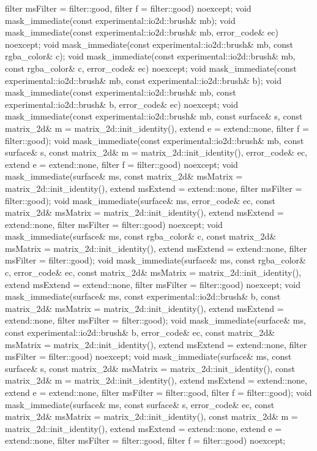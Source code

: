 \begin{codeblock}
{{{{{      filter msFilter = filter::good, filter f = filter::good) noexcept;
    void mask_immediate(const experimental::io2d::brush& mb);
    void mask_immediate(const experimental::io2d::brush& mb, error_code& ec)
      noexcept;
    void mask_immediate(const experimental::io2d::brush& mb,
      const rgba_color& c);
    void mask_immediate(const experimental::io2d::brush& mb,
      const rgba_color& c, error_code& ec) noexcept;
    void mask_immediate(const experimental::io2d::brush& mb,
      const experimental::io2d::brush& b);
    void mask_immediate(const experimental::io2d::brush& mb,
      const experimental::io2d::brush& b, error_code& ec) noexcept;
    void mask_immediate(const experimental::io2d::brush& mb, const surface& s, 
      const matrix_2d& m = matrix_2d::init_identity(), extend e = extend::none, 
      filter f = filter::good);
    void mask_immediate(const experimental::io2d::brush& mb, const surface& s,
      const matrix_2d& m = matrix_2d::init_identity(), error_code& ec,
      extend e = extend::none, filter f = filter::good) noexcept;
    void mask_immediate(surface& ms,
      const matrix_2d& msMatrix = matrix_2d::init_identity(),
      extend msExtend = extend::none, filter msFilter = filter::good);
    void mask_immediate(surface& ms, error_code& ec, 
      const matrix_2d& msMatrix = matrix_2d::init_identity(),
      extend msExtend = extend::none, filter msFilter = filter::good) noexcept;
    void mask_immediate(surface& ms, const rgba_color& c, 
      const matrix_2d& msMatrix = matrix_2d::init_identity(),
      extend msExtend = extend::none, filter msFilter = filter::good);
    void mask_immediate(surface& ms, const rgba_color& c, error_code& ec, 
      const matrix_2d& msMatrix = matrix_2d::init_identity(),
      extend msExtend = extend::none, filter msFilter = filter::good) noexcept;
    void mask_immediate(surface& ms, const experimental::io2d::brush& b, 
      const matrix_2d& msMatrix = matrix_2d::init_identity(),
      extend msExtend = extend::none, filter msFilter = filter::good);
    void mask_immediate(surface& ms, const experimental::io2d::brush& b,
      error_code& ec, const matrix_2d& msMatrix = matrix_2d::init_identity(),
      extend msExtend = extend::none, filter msFilter = filter::good) noexcept;
    void mask_immediate(surface& ms, const surface& s, 
      const matrix_2d& msMatrix = matrix_2d::init_identity(),
      const matrix_2d& m = matrix_2d::init_identity(),
      extend msExtend = extend::none, extend e = extend::none,
      filter msFilter = filter::good, filter f = filter::good);
    void mask_immediate(surface& ms, const surface& s, error_code& ec,
      const matrix_2d& msMatrix = matrix_2d::init_identity(),
      const matrix_2d& m = matrix_2d::init_identity(),
      extend msExtend = extend::none, extend e = extend::none,
      filter msFilter = filter::good, filter f = filter::good) noexcept;
    
}}}}}
\end{codeblock}

